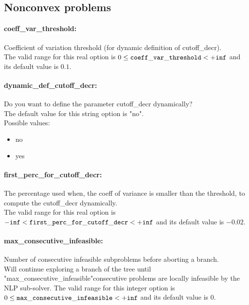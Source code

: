 \subsection{Nonconvex problems}
\label{sec:Nonconvexproblems}
\paragraph{coeff\_var\_threshold:}\label{opt:coeff_var_threshold} Coefficient of variation threshold (for dynamic definition of cutoff\_decr). \\
 The valid range for this real option is 
$0 \le {\tt coeff\_var\_threshold } <  {\tt +inf}$
and its default value is $0.1$.


\paragraph{dynamic\_def\_cutoff\_decr:}\label{opt:dynamic_def_cutoff_decr} Do you want to define the parameter cutoff\_decr dynamically? \\
 The default value for this string option is "no".
\\ 
Possible values:
\begin{itemize}
   \item no
   \item yes
\end{itemize}

\paragraph{first\_perc\_for\_cutoff\_decr:}\label{opt:first_perc_for_cutoff_decr} The percentage used when, the coeff of variance is smaller than the threshold, to compute the cutoff\_decr dynamically. \\
 The valid range for this real option is 
${\tt -inf} <  {\tt first\_perc\_for\_cutoff\_decr } <  {\tt +inf}$
and its default value is $-0.02$.


\paragraph{max\_consecutive\_infeasible:}\label{opt:max_consecutive_infeasible} Number of consecutive infeasible subproblems before aborting a branch. \\
 Will continue exploring a branch of the tree until "max\_consecutive\_infeasible"consecutive problems are locally infeasible by the NLP sub-solver. The valid range for this integer option is
$0 \le {\tt max\_consecutive\_infeasible } <  {\tt +inf}$
and its default value is $0$.


